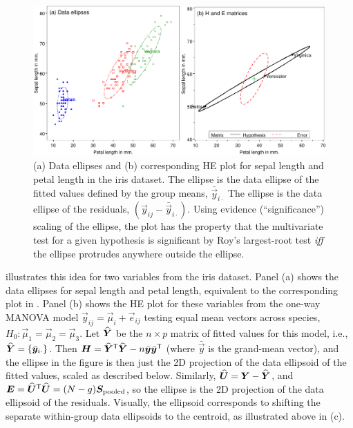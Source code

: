 \begin{figure}[htb]
  \centering
  \includegraphics[width=.9\textwidth,clip]{fig/heplot3a}
  \caption{(a) Data ellipses and (b) corresponding HE plot for sepal length and petal length in the iris dataset.
  	The  ellipse is the data ellipse of the fitted values defined by the group means, $\bar{\vec{y}}_{i \cdot}$
  	The  ellipse is the data ellipse of the residuals, $(\vec{y}_{ij} - \bar{\vec{y}}_{i \cdot})$.
  	Using evidence (``significance'') scaling of the  ellipse, the plot has the property that
  	the multivariate test for a given hypothesis is significant by Roy's largest-root test \emph{iff}
  	the  ellipse protrudes anywhere outside the  ellipse.}%
  \label{fig:heplot3a}
\end{figure}

 illustrates this idea for two variables from the iris dataset.
Panel (a) shows the data ellipses for sepal length and petal length, equivalent to
the corresponding plot in . Panel (b) shows the HE plot for these
variables from the one-way MANOVA model $\vec{y}_{ij} = \vec{\mu}_i + \vec{e}_{ij}$
testing equal mean vectors across species, $H_0: \vec{\mu}_1 = \vec{\mu}_2 = \vec{\mu}_3$.
Let $\widehat{\bm{Y}}$ be the $n \times p$ matrix of fitted values for this model,
i.e., $\widehat{\bm{Y}} = \{ \bar{\bm{y}}_{i \cdot} \}$.
Then $\bm{H}= \widehat{\bm{Y}}^\mathsf{T} \widehat{\bm{Y}} - n\bar{\bm{y}} \bar{\bm{y}}^\mathsf{T} $ (where $\bar{\vec{y}}$ is the grand-mean vector), and the  ellipse in the figure is then just the
2D projection of the data ellipsoid
of the fitted values, scaled as described below.
Similarly, $\widehat{\bm{U}} = \bm{Y} - \widehat{\bm{Y}}$, and
$\bm{E} = \widehat{\bm{U}}^\mathsf{T}  \widehat{\bm{U}} = (N-g) \bm{S}_{\mathrm{pooled}}$, so the  ellipse is
the 2D projection of the data ellipsoid of the residuals.
Visually, the  ellipsoid corresponds to shifting the separate within-group data ellipsoids to the centroid,
as illustrated above in (c).

